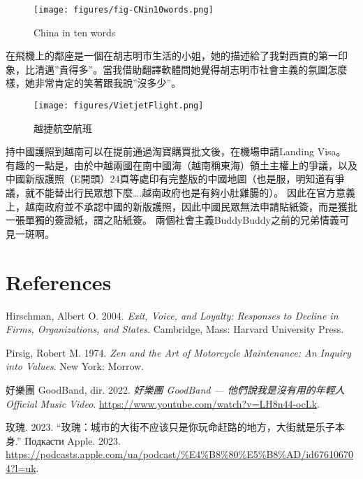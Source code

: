 \documentclass[
  a4paper,
]{ctexart}
\newlength{\cslhangindent}
\newlength{\cslentryspacingunit} %
\newenvironment{CSLReferences}[2] %
 {%
  \setlength{\parindent}{0pt}
  \ifodd #1
  \let\oldpar\par
  \def\par{\hangindent=\cslhangindent\oldpar}
  \fi
  \setlength{\parskip}{#2\cslentryspacingunit}
 }%
 {}
\begin{document}
\begin{figure}

{\centering \texttt{[image: figures/fig-CNin10words.png]}

}

\caption{\label{fig-CNin10words}China in ten words}

\end{figure}

在飛機上的鄰座是一個在胡志明市生活的小姐，她的描述給了我對西貢的第一印象，比清邁''貴得多''。當我借助翻譯軟體問她覺得胡志明市社會主義的氛圍怎麼樣，她非常肯定的笑著跟我說''沒多少''。

\begin{figure}

{\centering \texttt{[image: figures/VietjetFlight.png]}

}

\caption{越捷航空航班}

\end{figure}

持中國護照到越南可以在提前通過淘寶購買批文後，在機場申請Landing Visa。
有趣的一點是，由於中越兩國在南中國海（越南稱東海）領土主權上的爭議，以及中國新版護照（E開頭）24頁等處印有完整版的中國地圖（也是服，明知道有爭議，就不能替出行民眾想下麼\ldots.越南政府也是有夠小肚雞腸的）。
因此在官方意義上，越南政府並不承認中國的新版護照，因此中國民眾無法申請貼紙簽，而是獲批一張單獨的簽證紙，謂之貼紙簽。
兩個社會主義BuddyBuddy之前的兄弟情義可見一斑啊。


\hypertarget{references}{%
\chapter*{References}\label{references}}


\hypertarget{refs}{}
\begin{CSLReferences}{1}{0}
\leavevmode{}%
Hirschman, Albert O. 2004. \emph{Exit, Voice, and Loyalty: Responses to
Decline in Firms, Organizations, and States}. {Cambridge, Mass}:
{Harvard University Press}.

\leavevmode{}%
Pirsig, Robert M. 1974. \emph{Zen and the Art of Motorcycle Maintenance:
An Inquiry into Values}. {New York}: {Morrow}.

\leavevmode{}%
好樂團 GoodBand, dir. 2022. \emph{好樂團 {GoodBand} ---
他們說我是沒有用的年輕人 {Official Music Video}}.
\url{https://www.youtube.com/watch?v=LH8n44-ocLk}.

\leavevmode{}%
玫瑰. 2023.
{``玫瑰：城市的大街不应该只是你玩命赶路的地方，大街就是乐子本身.''}
{Подкасти Apple}. 2023.
\url{https://podcasts.apple.com/ua/podcast/\%E4\%B8\%80\%E5\%B8\%AD/id676106704?l=uk}.

\end{CSLReferences}
\end{document}
